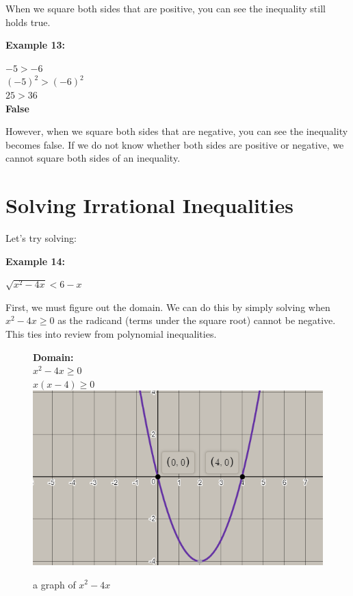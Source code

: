\documentclass[12pt,fleqn]{book} %
\begin{document}
\noindent When we square both sides that are positive, you can see the inequality still holds true. 

\noindent\textbf{Example 13:}

\vspace*{-5mm}

\begin{center}
    $-5>-6$\\
    $(-5)^2>(-6)^2$\\
    $25>36$\\
    \textbf{False}\\
\end{center}

\vspace*{-3mm}

\noindent However, when we square both sides that are negative, you can see the inequality becomes false. If we do not know whether both sides are positive or negative, we cannot square both sides of an inequality.

\pagebreak

\section{Solving Irrational Inequalities}

\noindent Let's try solving:

\noindent\textbf{Example 14:}

\begin{center}
    \LARGE{$\sqrt{x^2-4x}<6-x$}
\end{center}

\noindent First, we must figure out the domain. We can do this by simply solving when $x^2-4x\geq0$ as the radicand (terms under the square root) cannot be negative. This ties into review from polynomial inequalities. 

\vspace*{-4mm}

\begin{figure}[h]
\begin{center}
\textbf{Domain:}\\
    $x^2-4x\geq0$\\
    $x(x-4)\geq0$\\
\includegraphics[scale=0.75]{Pictures/Graph2.PNG}
\caption{a graph of $x^2-4x$}
\end{center}
\end{figure}
\end{document}

